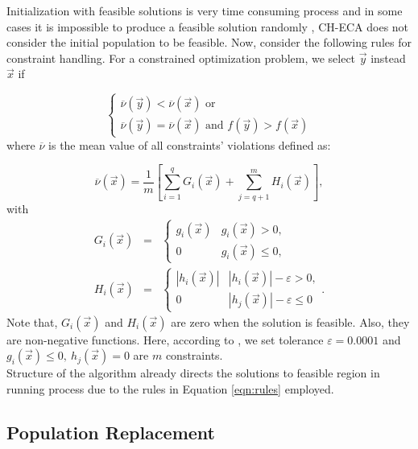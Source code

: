 \documentclass[conference]{IEEEtran}
\begin{document}
Initialization with feasible solutions is very time consuming process and in some 
cases it is impossible to produce a feasible solution randomly \cite{castillofoundations}, 
CH-ECA does not consider the initial population to be feasible. Now, consider the 
following rules for constraint handling. For a constrained optimization problem, 
we select $\vec{y}$ instead $\vec{x}$ if

\begin{equation}
	\begin{cases}
	\overline{\nu}( \vec{y} ) < \overline{\nu}( \vec{x} )  \text{ or}\\
	\overline{\nu}( \vec{y} ) = \overline{\nu}( \vec{x} ) \text{ and } f(\vec{y}) > f(\vec{x})
	\end{cases}
	\label{eqn:rules}
\end{equation}
where $\overline{\nu}$ is the mean value of all constraints’ violations defined as:

\begin{equation}
	\overline{\nu}( \vec{x} ) = \dfrac{1}{m} \left[ \sum_{i=1}^q G_i(\vec{x}) + \sum_{j=q+1}^m H_i(\vec{x}) \right],
	\label{eqn:nu}
\end{equation}
%
with 
\begin{eqnarray}
	G_i(\vec{x}) &=&
	\begin{cases}
		g_i(\vec{x})   & g_i(\vec{x}) > 0,  \\
		    0          & g_i(\vec{x}) \leq 0,
	\end{cases}
	\\
	H_i(\vec{x}) &=&
	\begin{cases}
		|h_i(\vec{x})|   & |h_i(\vec{x})| - \varepsilon  > 0,  \\
		    0            & |h_j(\vec{x})| - \varepsilon \leq 0
	\end{cases}
	.
\end{eqnarray}
%
Note that, $G_i(\vec{x})$ and $H_i(\vec{x})$ are zero when the solution is feasible. 
Also, they are non-negative functions. Here, according to \cite{cecCop17}, we set 
tolerance $\varepsilon = 0.0001$ and $g_i(\vec{x}) \leq 0,\ h_j(\vec{x}) = 0$ are 
$m$ constraints.\\

Structure of the algorithm already directs the solutions to feasible region in 
running process due to the rules in Equation  \ref{eqn:rules} employed.


\subsection{Population Replacement} %
\end{document}
